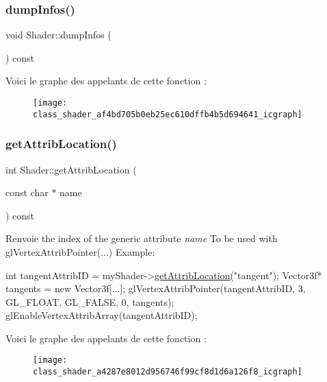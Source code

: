 \subsubsection{\texorpdfstring{dump\+Infos()}{dumpInfos()}}
{\footnotesize\ttfamily void Shader\+::dump\+Infos (\begin{DoxyParamCaption}{ }\end{DoxyParamCaption}) const}

Voici le graphe des appelants de cette fonction \+:\nopagebreak
\begin{figure}[H]
\begin{center}
\leavevmode
\texttt{[image: class\_shader\_af4bd705b0eb25ec610dffb4b5d694641\_icgraph]}
\end{center}
\end{figure}
\mbox{\label{class_shader_a4287e8012d956746f99cf8d1d6a126f8}} 
\subsubsection{\texorpdfstring{get\+Attrib\+Location()}{getAttribLocation()}}
{\footnotesize\ttfamily int Shader\+::get\+Attrib\+Location (\begin{DoxyParamCaption}\item[{const char $\ast$}]{name }\end{DoxyParamCaption}) const}

\begin{DoxyReturn}{Renvoie}
the index of the generic attribute {\itshape name} To be used with gl\+Vertex\+Attrib\+Pointer(...) Example\+: 
\begin{DoxyCode}
\textcolor{keywordtype}{int} tangentAttribID = myShader->\hyperlink{class_shader_a4287e8012d956746f99cf8d1d6a126f8}{getAttribLocation}(\textcolor{stringliteral}{"tangent"});
Vector3f* tangents = \textcolor{keyword}{new} Vector3f[...];
glVertexAttribPointer(tangentAttribID, 3, GL\_FLOAT, GL\_FALSE, 0, tangents);
glEnableVertexAttribArray(tangentAttribID);
\end{DoxyCode}
 
\end{DoxyReturn}
Voici le graphe des appelants de cette fonction \+:\nopagebreak
\begin{figure}[H]
\begin{center}
\leavevmode
\texttt{[image: class\_shader\_a4287e8012d956746f99cf8d1d6a126f8\_icgraph]}
\end{center}
\end{figure}
\mbox{\label{class_shader_ae42ef5734471e2cdf1e5045c8883961d}} 
